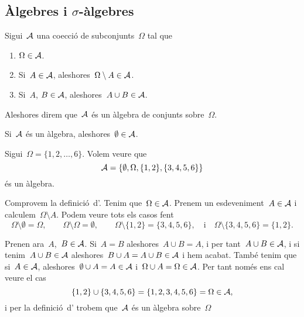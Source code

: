 \documentclass[../../Main.tex]{subfiles}
\begin{document}
\subsection{Àlgebres i \ensuremath{\sigma}-àlgebres}
	\begin{definition}[Àlgebra]
		\label{def:àlgebra}
		Sigui~\(\mathcal{A}\) una co{\lgem}ecció de subconjunts~\(\Omega\) tal que
		\begin{enumerate}
			\item \(\Omega\in\mathcal{A}\).
			\item Si~\(A\in\mathcal{A}\), aleshores~\(\Omega\setminus A\in\mathcal{A}\).
			\item Si~\(A\), \(B\in\mathcal{A}\), aleshores~\(A\cup B\in\mathcal{A}\).
		\end{enumerate}
		Aleshores direm que~\(\mathcal{A}\) és un àlgebra de conjunts sobre~\(\Omega\).
	\end{definition}
	\begin{observation}
		\label{obs:el conjunt buit pertany a qualsevol àlgebra}
		Si~\(\mathcal{A}\) és un àlgebra, aleshores~\(\emptyset\in\mathcal{A}\).
	\end{observation}
	\begin{example}
		\label{ex:exemple d'àlgebra}
		Sigui~\(\Omega=\{1,2,\dots,6\}\).
		Volem veure que
		\[
		    \mathcal{A}=\{\emptyset,\Omega,\{1,2\},\{3,4,5,6\}\}
		\]
		és un àlgebra.
		\begin{solution}
			Comprovem la definició~d'.
			Tenim que~\(\Omega\in\mathcal{A}\).
			Prenem un esdeveniment~\(A\in\mathcal{A}\) i calculem~\(\Omega\setminus A\).
			Podem veure tots els casos fent
			\[
				\Omega\setminus\emptyset=\Omega,\qquad
				\Omega\setminus\Omega=\emptyset,\qquad
				\Omega\setminus\{1,2\}=\{3,4,5,6\},\quad\text{i}\quad
				\Omega\setminus\{3,4,5,6\}=\{1,2\}.
			\]
			
			Prenen ara~\(A\),~\(B\in\mathcal{A}\).
			Si~\(A=B\) aleshores~\(A\cup B=A\), i per tant~\(A\cup B\in\mathcal{A}\), i si tenim~\(A\cup B\in\mathcal{A}\) aleshores~\(B\cup A=A\cup B\in\mathcal{A}\) i hem acabat.
			També tenim que si~\(A\in\mathcal{A}\), aleshores~\(\emptyset\cup A=A\in\mathcal{A}\) i~\(\Omega\cup A=\Omega\in\mathcal{A}\).
			Per tant només ens cal veure el cas
			\[
				\{1,2\}\cup\{3,4,5,6\}=\{1,2,3,4,5,6\}=\Omega\in\mathcal{A},
			\]
			i per la definició~d' trobem que~\(\mathcal{A}\) és un àlgebra sobre~\(\Omega\)
		\end{solution}
	\end{example}
\end{document}
